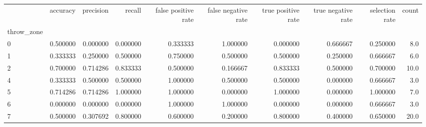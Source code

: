\begin{tabular}{lrrrrrrrrr}
\toprule
{} &  accuracy &  precision &    recall &  false positive rate &  false negative rate &  true positive rate &  true negative rate &  selection rate &  count \\
throw\_zone &           &            &           &                      &                      &                     &                     &                 &        \\
\midrule
0          &  0.500000 &   0.000000 &  0.000000 &             0.333333 &             1.000000 &            0.000000 &            0.666667 &        0.250000 &    8.0 \\
1          &  0.333333 &   0.250000 &  0.500000 &             0.750000 &             0.500000 &            0.500000 &            0.250000 &        0.666667 &    6.0 \\
2          &  0.700000 &   0.714286 &  0.833333 &             0.500000 &             0.166667 &            0.833333 &            0.500000 &        0.700000 &   10.0 \\
4          &  0.333333 &   0.500000 &  0.500000 &             1.000000 &             0.500000 &            0.500000 &            0.000000 &        0.666667 &    3.0 \\
5          &  0.714286 &   0.714286 &  1.000000 &             1.000000 &             0.000000 &            1.000000 &            0.000000 &        1.000000 &    7.0 \\
6          &  0.000000 &   0.000000 &  0.000000 &             1.000000 &             1.000000 &            0.000000 &            0.000000 &        0.666667 &    3.0 \\
7          &  0.500000 &   0.307692 &  0.800000 &             0.600000 &             0.200000 &            0.800000 &            0.400000 &        0.650000 &   20.0 \\
\bottomrule
\end{tabular}
